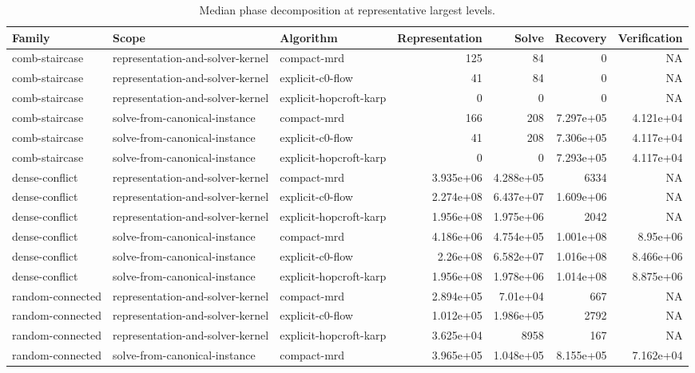 \begin{table}[t]
\caption{Median phase decomposition at representative largest levels.}
\label{tab:kernel-phases}
\begin{tabular}{lllrrrr}
\toprule
Family & Scope & Algorithm & Representation & Solve & Recovery & Verification \\
\midrule
comb-staircase & representation-and-solver-kernel & compact-mrd & 125 & 84 & 0 & NA \\
comb-staircase & representation-and-solver-kernel & explicit-c0-flow & 41 & 84 & 0 & NA \\
comb-staircase & representation-and-solver-kernel & explicit-hopcroft-karp & 0 & 0 & 0 & NA \\
comb-staircase & solve-from-canonical-instance & compact-mrd & 166 & 208 & 7.297e+05 & 4.121e+04 \\
comb-staircase & solve-from-canonical-instance & explicit-c0-flow & 41 & 208 & 7.306e+05 & 4.117e+04 \\
comb-staircase & solve-from-canonical-instance & explicit-hopcroft-karp & 0 & 0 & 7.293e+05 & 4.117e+04 \\
dense-conflict & representation-and-solver-kernel & compact-mrd & 3.935e+06 & 4.288e+05 & 6334 & NA \\
dense-conflict & representation-and-solver-kernel & explicit-c0-flow & 2.274e+08 & 6.437e+07 & 1.609e+06 & NA \\
dense-conflict & representation-and-solver-kernel & explicit-hopcroft-karp & 1.956e+08 & 1.975e+06 & 2042 & NA \\
dense-conflict & solve-from-canonical-instance & compact-mrd & 4.186e+06 & 4.754e+05 & 1.001e+08 & 8.95e+06 \\
dense-conflict & solve-from-canonical-instance & explicit-c0-flow & 2.26e+08 & 6.582e+07 & 1.016e+08 & 8.466e+06 \\
dense-conflict & solve-from-canonical-instance & explicit-hopcroft-karp & 1.956e+08 & 1.978e+06 & 1.014e+08 & 8.875e+06 \\
random-connected & representation-and-solver-kernel & compact-mrd & 2.894e+05 & 7.01e+04 & 667 & NA \\
random-connected & representation-and-solver-kernel & explicit-c0-flow & 1.012e+05 & 1.986e+05 & 2792 & NA \\
random-connected & representation-and-solver-kernel & explicit-hopcroft-karp & 3.625e+04 & 8958 & 167 & NA \\
random-connected & solve-from-canonical-instance & compact-mrd & 3.965e+05 & 1.048e+05 & 8.155e+05 & 7.162e+04 \\

\end{tabular}
\end{table}
